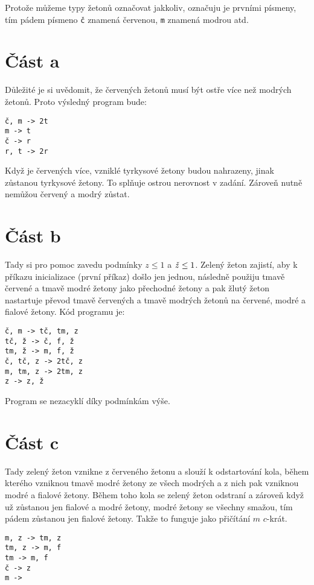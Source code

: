 \documentclass{fkssolpub}
\author{Ondřej Sedláček}
\begin{document}
Protože můžeme typy žetonů označovat jakkoliv, označuju je prvními písmeny,
tím pádem písmeno \verb|č| znamená červenou, \verb|m| znamená modrou atd.

\section{Část a}

Důležité je si uvědomit, že červených žetonů musí být ostře více než modrých
žetonů. Proto výsledný program bude:

\begin{verbatim}
č, m -> 2t
m -> t
č -> r
r, t -> 2r
\end{verbatim}

Když je červených více, vzniklé tyrkysové žetony budou nahrazeny, jinak
zůstanou tyrkysové žetony. To splňuje ostrou nerovnost v zadání. Zároveň
nutně nemůžou červený a modrý zůstat.

\section{Část b}

Tady si pro pomoc zavedu podmínky $z \leq 1$ a $\text{\textit{ž}} \leq 1$. Zelený žeton
zajistí, aby k příkazu inicializace (první příkaz) došlo jen jednou,
následně použiju tmavě červené a tmavě modré žetony jako přechodné žetony
a pak žlutý žeton nastartuje převod tmavě červených a tmavě modrých žetonů
na červené, modré a fialové žetony. Kód programu je:

\begin{verbatim}
č, m -> tč, tm, z
tč, ž -> č, f, ž
tm, ž -> m, f, ž
č, tč, z -> 2tč, z
m, tm, z -> 2tm, z
z -> z, ž
\end{verbatim}

Program se nezacyklí díky podmínkám výše.

\section{Část c}

Tady zelený žeton vznikne z červeného žetonu a slouží k odstartování kola,
během kterého vzniknou tmavě modré žetony ze všech modrých a z nich pak
vzniknou modré a fialové žetony. Během toho kola se zelený žeton odstraní a
zároveň když už zůstanou jen fialové a modré žetony, modré žetony se všechny
smažou, tím pádem zůstanou jen fialové žetony. Takže to funguje jako přičítání
$m$ $c$-krát.

\begin{verbatim}
m, z -> tm, z
tm, z -> m, f
tm -> m, f
č -> z
m -> 
\end{verbatim}
\end{document}

